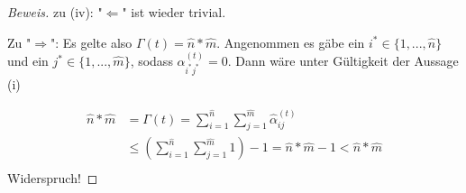 \begin{proof}[Beweis]
zu (iv): 
"$\Leftarrow$" ist wieder trivial.

\vspace{0.4cm} 

Zu "$\Rightarrow$": Es gelte also $\Gamma(t) = \widehat{n} * \widehat{m}$. Angenommen es gäbe ein $i^{*} \in \{1,...,\widehat{n}\}$ und ein $j^{*} \in \{1,...,\widehat{m}\}$, sodass $\alpha^{(t)}_{i^{*}j^{*}} = 0$. Dann wäre unter Gültigkeit der Aussage (i)

\begin{align*}
\widehat{n} * \widehat{m} &= \Gamma(t) = \sum_{i=1}^{\widehat{n}} \sum_{j=1}^{\widehat{m}} \widehat{\alpha}^{(t)}_{ij} \\
&\leq \left(\sum_{i=1}^{\widehat{n}} \sum_{j=1}^{\widehat{m}} 1 \right) - 1 = \widehat{n} * \widehat{m} - 1 < \widehat{n} * \widehat{m} \\
\end{align*}
Widerspruch!
  
\end{proof}
\vspace{0.6cm}



